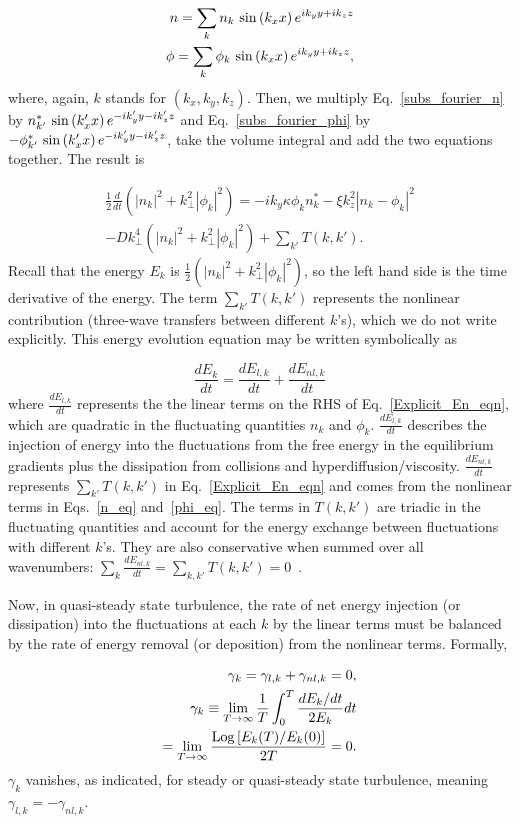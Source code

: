 \documentclass[twocolumn,showkeys,superscriptaddress]{revtex4}
\def\beq{\begin{equation}}
\def\eeq{\end{equation}}
\def\beqar{\begin{eqnarray}}
\def\eeqar{\end{eqnarray}}
\newcommand{\diff}[2]{\frac{d#1}{d#2}}
\begin{document}
\beqar
\label{subs_fourier_n}
n = \sum_{k} n_k \ {\rm sin} \left( k_x x \right) e^{i k_y y + i k_z z} \\
\label{subs_fourier_phi}
\phi = \sum_{k} \phi_k \ {\rm sin} \left( k_x x \right) e^{i k_y y + i k_z z},
\eeqar
where, again, $k$ stands for $(k_x,k_y,k_z)$.
Then, we multiply Eq.~\ref{subs_fourier_n} by $n^*_{k'} \ {\rm sin} \left( k'_x x \right) e^{-i k'_y y - i k'_z z}$ and Eq.~\ref{subs_fourier_phi} by 
$-\phi^*_{k'} \ {\rm sin} \left( k'_x x \right) e^{-i k'_y y - i k'_z z}$, take the volume integral and add the two equations together. The result is

\beqar
\label{Explicit_En_eqn}
\frac{1}{2} \diff{}{t} \left( |n_k|^2 + k^2_\perp |\phi_k|^2 \right) = -i k_y \kappa \phi_k n^*_k - \xi k_z^2 |n_k - \phi_k|^2 \nonumber \\
- D k^4_\perp \left( |n_k|^2 + k^2_\perp |\phi_k|^2 \right) + \sum_{k'} T(k,k'). \quad \quad
\eeqar
Recall that the energy $E_k$ is $\frac{1}{2} \left( |n_k|^2 + k^2_\perp |\phi_k|^2 \right)$, so the left hand side is the time derivative of the energy.
The term $\sum_{k'} T(k,k')$ represents the nonlinear contribution (three-wave transfers between different $k$'s), 
which we do not write explicitly. This energy evolution equation may be written symbolically as

\beq
\label{dEdt_def}
\diff{E_k}{t} = \diff{E_{l,k}}{t} + \diff{E_{nl,k}}{t}
\eeq
where $\diff{E_{l,k}}{t}$ represents the the linear terms on the RHS of Eq.~\ref{Explicit_En_eqn}, which are quadratic in the fluctuating quantities $n_k$ and $\phi_k$.
$\diff{E_{l,k}}{t}$ describes the injection of energy into the fluctuations from the free energy in the equilibrium gradients plus the dissipation from collisions and hyperdiffusion/viscosity.
$\diff{E_{nl,k}}{t}$ represents $\sum_{k'} T(k,k')$ in  Eq.~\ref{Explicit_En_eqn} and comes from the nonlinear terms in Eqs.~\ref{n_eq} and~\ref{phi_eq}. 
The terms in $T(k,k')$ are triadic in the fluctuating quantities and account for the energy exchange between fluctuations with different $k$'s. 
They are also conservative when summed over all wavenumbers: $\sum_{k} \diff{E_{nl,k}}{t} = \sum_{k,k'} T(k,k') = 0$~\cite{camargo1995}.

Now, in quasi-steady state turbulence, the rate of net energy injection (or dissipation) into the fluctuations at each $k$ by the linear terms must be balanced by
the rate of energy removal (or deposition) from the nonlinear terms. Formally,

\beqar
\label{steady_state}
\gamma_k = \gamma_{l,k} + \gamma_{nl,k} = 0, \\
\gamma_k \equiv  \displaystyle\lim_{T \to \infty} \frac{1}{T} \int_0^T \frac{dE_k/dt}{2 E_k} dt \nonumber \\
= \displaystyle\lim_{T \to \infty} \frac{{\rm{Log}}\left[ E_k(T)/E_k(0) \right]}{2 T} = 0.
\eeqar
$\gamma_k$ vanishes, as indicated, for steady or quasi-steady state turbulence, meaning $\gamma_{l,k} = - \gamma_{nl,k}$.
\end{document}
